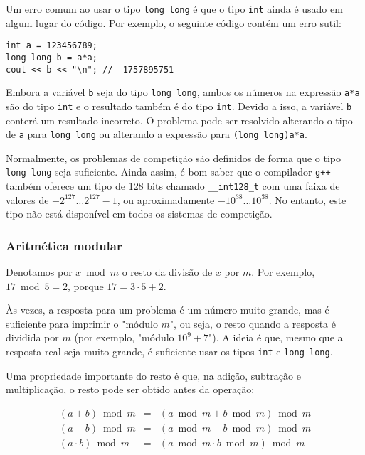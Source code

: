 Um erro comum ao usar o tipo \texttt{long long}
é que o tipo \texttt{int} ainda é usado em algum lugar do código.
Por exemplo, o seguinte código contém um erro sutil:

\begin{lstlisting}
int a = 123456789;
long long b = a*a;
cout << b << "\n"; // -1757895751
\end{lstlisting}

Embora a variável \texttt{b} seja do tipo \texttt{long long},
ambos os números na expressão \texttt{a*a} são do tipo \texttt{int} e o resultado também é do tipo \texttt{int}.
Devido a isso, a variável \texttt{b} conterá um resultado incorreto.
O problema pode ser resolvido alterando o tipo de \texttt{a} para \texttt{long long} ou alterando a expressão para \texttt{(long long)a*a}.

Normalmente, os problemas de competição são definidos de forma que o tipo \texttt{long long} seja suficiente. Ainda assim, é bom saber que o compilador \texttt{g++} também oferece um tipo de 128 bits chamado \texttt{\_\_int128\_t} com uma faixa de valores de $-2^{127} \ldots 2^{127}-1$, ou aproximadamente $-10^{38} \ldots 10^{38}$. No entanto, este tipo não está disponível em todos os sistemas de competição.

\subsubsection{Aritmética modular}


Denotamos por $x \bmod m$ o resto da divisão de $x$ por $m$. Por exemplo, $17 \bmod 5 = 2$, porque $17 = 3 \cdot 5 + 2$.

Às vezes, a resposta para um problema é um número muito grande, mas é suficiente para imprimir o "módulo $m$", ou seja, o resto quando a resposta é dividida por $m$ (por exemplo, "módulo $10^9+7$"). A ideia é que, mesmo que a resposta real seja muito grande, é suficiente usar os tipos \texttt{int} e \texttt{long long}.

Uma propriedade importante do resto é que,
na adição, subtração e multiplicação,
o resto pode ser obtido antes da operação:

\[
\begin{array}{rcr}
(a+b) \bmod m & = & (a \bmod m + b \bmod m) \bmod m \\
(a-b) \bmod m & = & (a \bmod m - b \bmod m) \bmod m \\
(a \cdot b) \bmod m & = & (a \bmod m \cdot b \bmod m) \bmod m
\end{array}
\]

